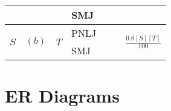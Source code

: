 \documentclass{article}
\newcommand{\sol}[1]{\iftoggle{showsolutions}{\textcolor{red}{#1}}{\phantom{#1}}}
\begin{document}
\begin{center}
\begin{tabular}{|l|l|l|l|l|l|l|}
                         &                        &                      & SMJ  & \sol{$(b)$}    & \sol{$SC(0.5[R]) + 0.5[R][S]$} & \\\hline
    \multirow{2}{*}{$S$} & \multirow{2}{*}{$(b)$} & \multirow{2}{*}{$T$} & PNLJ & \sol{None}     & \sol{$\bnlj{[S]}{0.6[T]}$}     & \multirow{2}{*}{$\frac{0.6[S][T]}{100}$} \\\cline{4-6}
                         &                        &                      & SMJ  & \sol{$(c, b)$} & \sol{$\smj{[S]}{0.6[T]}$}      & \\\hline
  \end{tabular}
\end{center}

\section{ER Diagrams}
\newcommand{\basedrawing}{
  \node[draw] (R) at (0, 0) {$R$};
  \node[circle, draw] (Ra) at (-0.5, 1) {\underline{$a$}};
  \node[circle, draw] (Rb) at (0.5, 1) {$b$};

  \node[diamond, draw] (L) at (1.5, 0) {$L$};

  \node[draw] (S) at (3, 0) {$S$};
  \node[circle, draw] (Sa) at (2.5, 1) {\underline{$b$}};
  \node[circle, draw] (Sb) at (3.5, 1) {$c$};
}
\end{document}
